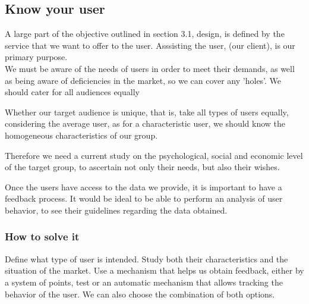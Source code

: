 \subsection{Know your user}
A large part of the objective outlined in section 3.1, design, is defined by the service that we want to offer
to the user. Asssisting the user, (our client), is our primary purpose. \\


We must be aware of the needs of users in order to meet their demands, as well as being aware of deficiencies in the market, so we can cover any 'holes'.
We should cater for all audiences equally 

Whether our target audience is unique, that is, take all types of users equally, considering the
average user, as for a characteristic user, we should know the homogeneous characteristics of our group.

Therefore we need a current study on the psychological, social and economic level of the target group, to ascertain not only
their needs, but also their wishes.

Once the users have access to the data we provide, it is important to have a feedback process.
It would be ideal to be able to perform an analysis of user behavior, to see their guidelines regarding the data obtained.
\subsubsection*{How to solve it} 
Define what type of user is intended. Study both their characteristics and the situation of the
market.
Use a mechanism that helps us obtain feedback, either by a system of points, test or
an automatic mechanism that allows tracking the behavior of the user. We can also choose the combination of both
options.

